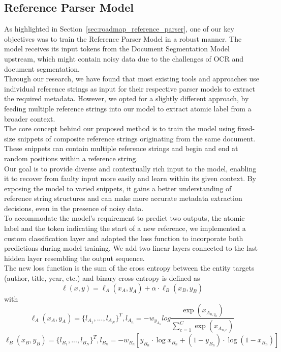 \subsection{Reference Parser Model}\label{sec:component_ref_parser}
As highlighted in Section~\ref{sec:roadmap_reference_parser}, one of our key objectives was to train the Reference Parser Model in a robust manner. The model receives its input tokens from the Document Segmentation Model upstream, which might contain noisy data due to the challenges of OCR and document segmentation.\\
Through our research, we have found that most existing tools and approaches use individual reference strings as input for their respective parser models to extract the required metadata. However, we opted for a slightly different approach, by feeding multiple reference strings into our model to extract atomic label from a broader context.\\
The core concept behind our proposed method is to train the model using fixed-size snippets of composite reference strings originating from the same document. These snippets can contain multiple reference strings and begin and end at random positions within a reference string.\\
Our goal is to provide diverse and contextually rich input to the model, enabling it to recover from faulty input more easily and learn within its given context. By exposing the model to varied snippets, it gains a better understanding of reference string structures and can make more accurate metadata extraction decisions, even in the presence of noisy data.\\
To accommodate the model's requirement to predict two outputs, the atomic label and the token indicating the start of a new reference, we implemented a custom classification layer and adapted the loss function to incorporate both predictions during model training. We add two linear layers connected to the last hidden layer resembling the output sequence.\\
The new loss function is the sum of the cross entropy between the entity targets (author, title, year, etc.)   and binary cross entropy is defined as
\begin{equation}
    \ell(x,y) = \ell_A(x_A,y_A) + \alpha \cdot \ell_B(x_B, y_B)
\end{equation}
with
\begin{equation}
    \ell_A(x_A,y_A) = \{l_{A_{1}},...,l_{A_{N}}\}^T, l_{A_{n}} = -w_{y_{A_{n}}} log\frac{\exp(x_{A_{n,y_{n}}})}{\sum_{c=1}^{C}\exp(x_{A_{n,c}})}
\end{equation}
\begin{equation}
    \ell_B(x_B,y_B) = \{l_{B_{1}},...,l_{B_{N}}\}^T, l_{B_{n}} = -w_{B_{n}} [y_{B_{n}} \cdot \log x_{B_{n}} + (1 - y_{B_{n}}) \cdot \log(1 - x_{B_{n}})] 
\end{equation}

